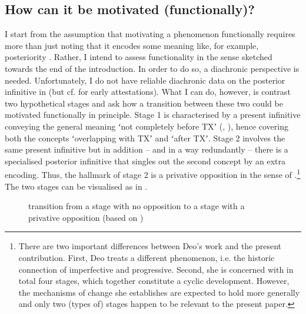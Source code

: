 \documentclass[output=paper,hidelinks]{langscibook}
\begin{document}
\subsection{How can it be motivated (functionally)?}\label{sec:reiner:2.3}

I start from the assumption that motivating a phenomenon functionally requires more than just noting that it encodes some meaning like, for example, posteriority \citep[130]{Newmeyer2017}. Rather, I intend to assess functionality in the sense sketched towards the end of the introduction. In order to do so, a diachronic perspective is needed. Unfortunately, I do not have reliable diachronic data on the posterior infinitive in  (but cf. \citealt[510–512]{Reiner2015} for early attestations). What I can do, however, is contrast two hypothetical stages and ask how a transition between these two could be motivated functionally in principle. Stage 1 is characterised by a present infinitive conveying the general meaning ʻnot completely before TXʼ (\citealt[192–193]{Eisenberg2013a}, \citealt[102–103]{Eisenberg2013b}), hence covering both the concepts ʻoverlapping with TXʼ and ʻafter TXʼ. Stage 2 involves the same present infinitive but in addition – and in a way redundantly – there is a specialised posterior infinitive that singles out the second concept by an extra encoding. Thus, the hallmark of stage 2 is a privative opposition in the sense of \citet[16]{Deo_2015}.\footnote{There are two important differences between Deo’s work and the present contribution. First, Deo treats a different phenomenon, i.e. the historic connection of imperfective and progressive. Second, she is concerned with in total four stages, which together constitute a cyclic development. However, the mechanisms of change she establishes are expected to hold more generally \citep[46–48]{Deo_2015} and only two (types of) stages happen to be relevant to the present paper.}  The two stages can be visualised as in .\largerpage

\begin{figure}
\caption{transition from a stage with no opposition to a stage with a privative opposition (based on \citealt{Deo_2015})}
\label{fig:reiner:graph1}
\end{figure}
\end{document}

